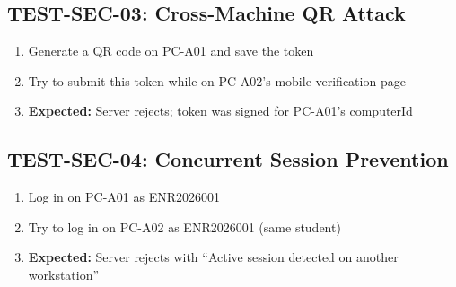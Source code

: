 \subsection{TEST-SEC-03: Cross-Machine QR Attack}
\begin{enumerate}[leftmargin=*]
  \item Generate a QR code on PC-A01 and save the token
  \item Try to submit this token while on PC-A02's mobile verification page
  \item \textbf{Expected:} Server rejects; token was signed for PC-A01's computerId
\end{enumerate}

\subsection{TEST-SEC-04: Concurrent Session Prevention}
\begin{enumerate}[leftmargin=*]
  \item Log in on PC-A01 as ENR2026001
  \item Try to log in on PC-A02 as ENR2026001 (same student)
  \item \textbf{Expected:} Server rejects with ``Active session detected on another workstation''
\end{enumerate}
